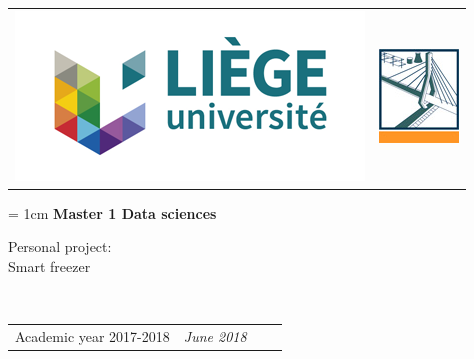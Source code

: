 \documentclass[a4paper, 10pt]{article}
\begin{document}

\begin{titlepage}

 	\begin{tabular}{p{11cm}p{8cm}}    
       		\includegraphics[scale=0.4]{logo_ulg.png}  &\raggedright{\includegraphics[scale=0.6]{Logo_FSAnew.png}}\\
         \end{tabular}
         
         	\begin{center}
		\unitlength = 1cm
         		\vspace{0.1cm}
         		\Large\textbf{Master 1 Data sciences}\\
         		\vspace{2.5cm}

{Personal project:}\\
\vspace*{0.5cm}
\Large Smart freezer
	\end{center}

      	\vspace*{2cm}
        \begin{center}
\end{center}
\vspace{2cm}
    \\
	      	\vspace{2.5cm}

	
	\begin{tabular}{p{12cm}p{12cm} l r}    
       		Academic year 2017-2018
       		&\raggedright{\large \noindent \textsl{June 2018}}
         \end{tabular}
   \end{titlepage}
   \setcounter{page}{1}


\newpage
\tableofcontents

\end{document}
